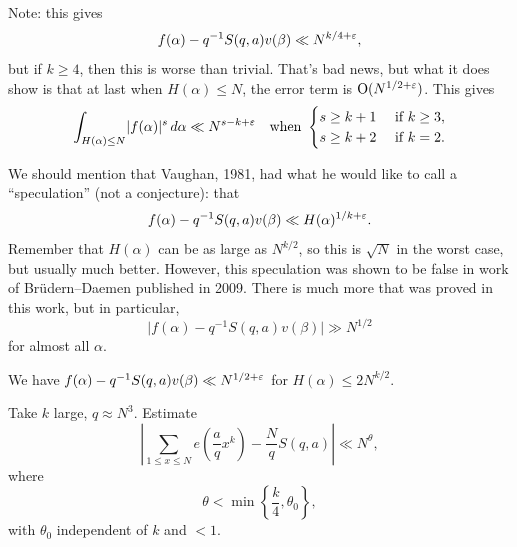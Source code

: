 \documentclass[reqno]{amsart} 
\numberwithin{theorem}{section}
\numberwithin{equation}{section}
\begin{document}
Note: this gives
\begin{equation*}
  f(\alpha) - q^{-1} S(q, a) v(\beta) \ll N^{k/4 + \varepsilon},
\end{equation*}
but if $k \geq 4$, then this is worse than trivial.  That's bad news, but what it does show is that at last when $H(\alpha) \leq N$, the error term is $\operatorname{O}(N^{1/2 + \varepsilon})$.  This gives
\begin{equation*}
  \int_{H(\alpha) \leq N} \lvert f(\alpha) \rvert^s \, d \alpha \ll N^{s - k + \varepsilon}
  \quad
  \text{when }
  \begin{cases}
    s \geq k + 1
    & \text{ if } k \geq 3, \\
    s \geq k + 2
                                                                                            & \text{ if } k = 2.
  \end{cases}
\end{equation*}

We should mention that Vaughan, 1981, had what he would like to call a ``speculation'' (not a conjecture): that
\begin{equation*}
  f(\alpha) - q^{-1} S(q, a) v(\beta) \ll H(\alpha)^{1/k + \varepsilon}.
\end{equation*}
Remember that $H(\alpha)$ can be as large as $N^{k/2}$, so this is $\sqrt{N}$ in the worst case, but usually much better.  However, this speculation was shown to be false in work of Brüdern--Daemen
published in 2009.  There is much more that was proved in this work, but in particular,
\begin{equation*}
  \lvert f(\alpha) - q^{-1} S(q, a) v(\beta) \rvert \gg N^{1/2}
\end{equation*}
for almost all $\alpha$.

\begin{conjecture}
  We have $f(\alpha) - q^{-1} S(q, a) v(\beta) \ll N^{1/2 + \varepsilon}$ for $H(\alpha) \leq 2 N^{k/2}$.
\end{conjecture}

\begin{problem}
  Take $k$ large, $q \approx N^3$.  Estimate
  \begin{equation*}
    \left\lvert \sum_{1 \leq x \leq N} e \left( \frac{a}{q} x^k \right)
      - \frac{N}{q}
      S(q, a)\right\rvert
    \ll N^\theta,
  \end{equation*}
  where
  \begin{equation*}
    \theta < \min \left\{ \frac{k}{4}, \theta_0 \right\},
  \end{equation*}
  with $\theta_0$ independent of $k$ and $< 1$.
\end{problem}
\end{document}
